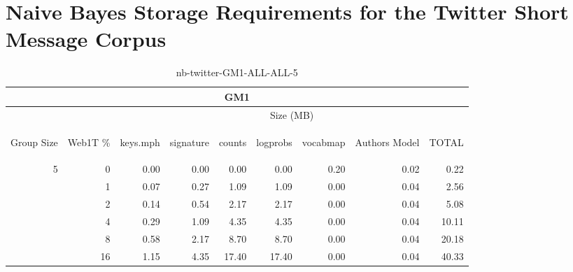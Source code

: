 \chapter{Naive Bayes Storage Requirements for the Twitter Short Message Corpus}

\begin{center}
\begin{table}[htbp]
\begin{tabular}{ | r | r | r | r | r | r | r | r | r |}
\hline
\multicolumn{9}{|c|}{GM1}\\
\hline
 & & \multicolumn{7}{|c|}{Size (MB)}\\ \cline{3-9}
\begin{sideways}Group Size\end{sideways} & \begin{sideways}Web1T \% \end{sideways} & \begin{sideways}keys.mph\end{sideways} & \begin{sideways}signature\end{sideways} & \begin{sideways}counts\end{sideways} & \begin{sideways}logprobs\end{sideways} & \begin{sideways}vocabmap\end{sideways} & \begin{sideways}Authors Model \end{sideways} & \begin{sideways}TOTAL\end{sideways}\\
\hline
\multirow{5}{*}{5}
 & 0 & 0.00 & 0.00 & 0.00 & 0.00 & 0.20 & 0.02 & 0.22\\ \cline{2-9}
 & 1 & 0.07 & 0.27 & 1.09 & 1.09 & 0.00 & 0.04 & 2.56\\ \cline{2-9}
 & 2 & 0.14 & 0.54 & 2.17 & 2.17 & 0.00 & 0.04 & 5.08\\ \cline{2-9}
 & 4 & 0.29 & 1.09 & 4.35 & 4.35 & 0.00 & 0.04 & 10.11\\ \cline{2-9}
 & 8 & 0.58 & 2.17 & 8.70 & 8.70 & 0.00 & 0.04 & 20.18\\ \cline{2-9}
 & 16 & 1.15 & 4.35 & 17.40 & 17.40 & 0.00 & 0.04 & 40.33\\ \cline{2-9}
\hline
\end{tabular}
\caption{nb-twitter-GM1-ALL-ALL-5}
\label{table:nb-twitter-GM1-ALL-ALL-5}
\end{table}
\end{center}

